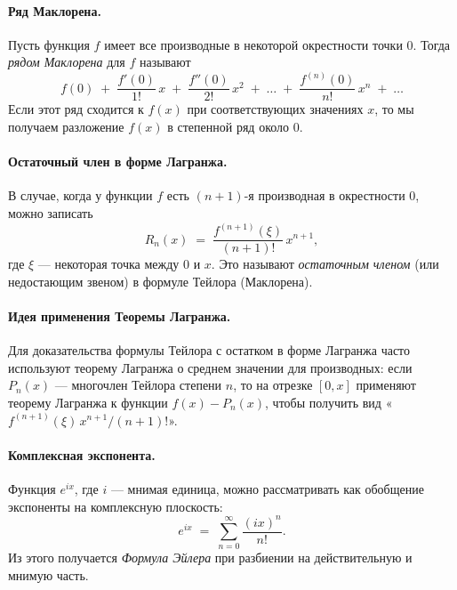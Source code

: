 
\paragraph{Ряд Маклорена.}
Пусть функция $f$ имеет все производные в некоторой окрестности точки $0$. Тогда
\emph{рядом Маклорена} для $f$ называют
\[
	f(0) \;+\; \frac{f'(0)}{1!}\,x \;+\; \frac{f''(0)}{2!}\,x^2 \;+\; \dots \;+\;
	\frac{f^{(n)}(0)}{n!}\,x^n \;+\; \dots
\]
Если этот ряд сходится к $f(x)$ при соответствующих значениях $x$, то мы получаем разложение $f(x)$ в степенной ряд около $0$.

\bigskip

\paragraph{Остаточный член в форме Лагранжа.}
В случае, когда у функции $f$ есть $(n+1)$-я производная в окрестности $0$, можно записать
\[
	R_n(x)
	\;=\;
	\frac{f^{(n+1)}(\xi)}{(n+1)!}\,x^{n+1},
\]
где $\xi$ — некоторая точка между $0$ и $x$. Это называют \emph{остаточным членом} (или недостающим звеном) в формуле Тейлора (Маклорена).

\bigskip

\paragraph{Идея применения Теоремы Лагранжа.}
Для доказательства формулы Тейлора с остатком в форме Лагранжа часто используют теорему Лагранжа о среднем значении для производных:
если $P_n(x)$ — многочлен Тейлора степени $n$, то на отрезке $[0,x]$ применяют теорему Лагранжа к функции $f(x)-P_n(x)$, чтобы получить вид «\,$f^{(n+1)}(\xi)\,x^{n+1}/(n+1)!$».

\bigskip

\paragraph{Комплексная экспонента.}
Функция $e^{ix}$, где $i$ — мнимая единица, можно рассматривать как обобщение экспоненты на комплексную плоскость:
\[
	e^{ix} \;=\; \sum_{n=0}^{\infty} \frac{(i x)^n}{n!}.
\]
Из этого получается \emph{Формула Эйлера} при разбиении на действительную и мнимую часть.
